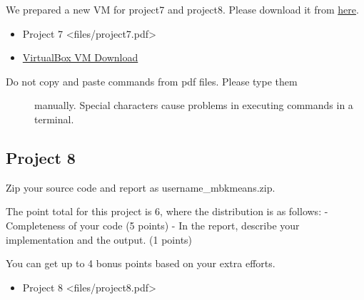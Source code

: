 We prepared a new VM for project7 and project8. Please download it from
\href{https://drive.google.com/file/d/0B2iFsq4CY1DteHhJUEk5cDNJajQ/view}{here}.

\begin{itemize}
\tightlist
\item
  Project 7 \textless{}files/project7.pdf\textgreater{}
\item
  \href{https://drive.google.com/file/d/0B2iFsq4CY1DteHhJUEk5cDNJajQ/view}{VirtualBox
  VM Download}
\end{itemize}

\begin{description}
\item[Do not copy and paste commands from pdf files. Please type them]
manually. Special characters cause problems in executing commands in a
terminal.
\end{description}

\subsection{Project 8}\label{project-8}

Zip your source code and report as username\_mbkmeans.zip.

The point total for this project is 6, where the distribution is as
follows: - Completeness of your code (5 points) - In the report,
describe your implementation and the output. (1 points)

You can get up to 4 bonus points based on your extra efforts.

\begin{itemize}
\tightlist
\item
  Project 8 \textless{}files/project8.pdf\textgreater{}
\end{itemize}
